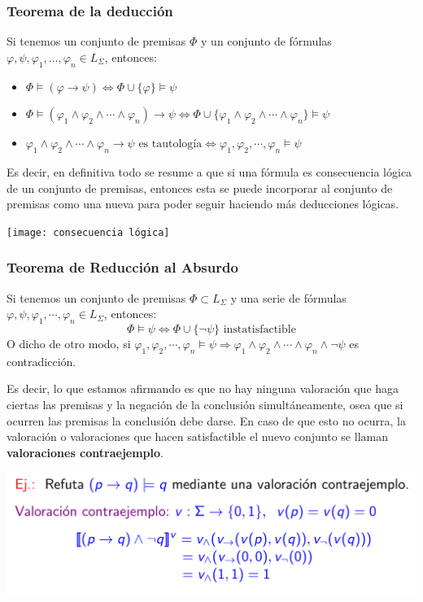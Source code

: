 \documentclass[10pt,a4paper,openright]{book}
\begin{document}
\subsubsection*{Teorema de la deducción}
Si tenemos un conjunto de premisas $\Phi$ y un conjunto de fórmulas $\varphi, \psi, \varphi_1, \ldots, \varphi_n\in L_\Sigma$, entonces:
\begin{itemize}
\item $\Phi\models (\varphi\rightarrow \psi) \Leftrightarrow \Phi\cup\{\varphi\}\models \psi$
\item $\Phi\models (\varphi_1 \wedge \varphi_2 \wedge \cdots \wedge \varphi_n)\rightarrow \psi \Leftrightarrow \Phi \cup \{\varphi_1 \wedge \varphi_2 \wedge \cdots \wedge \varphi_n\}\models \psi$
\item $\varphi_1 \wedge \varphi_2 \wedge \cdots \wedge \varphi_n \rightarrow \psi  \mbox{ es tautología}\Leftrightarrow \varphi_1, \varphi_2, \cdots, \varphi_n \models \psi$
\end{itemize}
Es decir, en definitiva todo se resume a que si una fórmula es consecuencia lógica de un conjunto de premisas, entonces esta se puede incorporar al conjunto de premisas como una nueva para poder seguir haciendo más deducciones lógicas.
\begin{center}
\texttt{[image: consecuencia lógica]}
\end{center}

\subsubsection*{Teorema de Reducción al Absurdo}
Si tenemos un conjunto de premisas $\Phi\subset L_\Sigma$ y una serie de fórmulas $\varphi, \psi, \varphi_1, \cdots, \varphi_n\in L_\Sigma$, entonces:
$$\Phi\models\psi\Leftrightarrow \Phi\cup \{\neg\psi\} \mbox{ instatisfactible}$$
O dicho de otro modo, si $\varphi_1, \varphi_2, \cdots , \varphi_n \models \psi\Rightarrow \varphi_1 \wedge \varphi_2 \wedge \cdots \wedge \varphi_n \wedge \neg \psi$ es contradicción.

Es decir, lo que estamos afirmando es que no hay ninguna valoración que haga ciertas las premisas y la negación de la conclusión simultáneamente, osea que si ocurren las premisas la conclusión debe darse. En caso de que esto no ocurra, la valoración o valoraciones que hacen satisfactible el nuevo conjunto se llaman \textbf{valoraciones contraejemplo}.
\begin{center}
\includegraphics[scale=0.5]{reduccion al absurdo}
\end{center}
\end{document}
